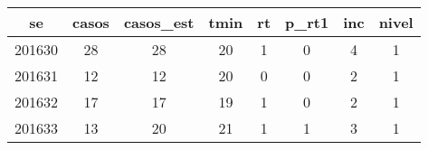 \begin{tabular}{c|ccccccc}
  \hline
se & casos & casos\_est & tmin & rt & p\_rt1 & inc & nivel \\ 
  \hline
201630 & 28 & 28 & 20 & 1 & 0 & 4 & 1 \\ 
  201631 & 12 & 12 & 20 & 0 & 0 & 2 & 1 \\ 
  201632 & 17 & 17 & 19 & 1 & 0 & 2 & 1 \\ 
  201633 & 13 & 20 & 21 & 1 & 1 & 3 & 1 \\ 
   \hline
\end{tabular}
